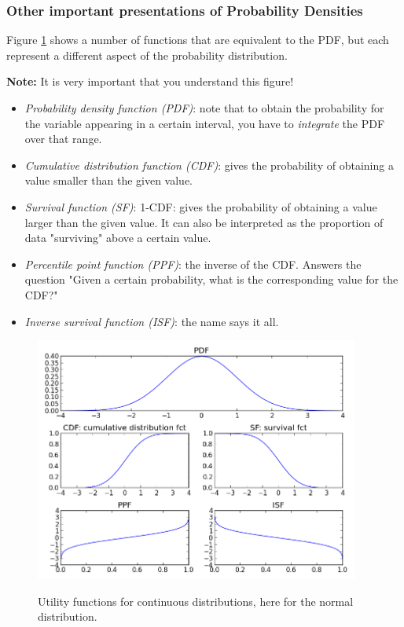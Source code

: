 \subsubsection{Other important presentations of Probability Densities}

Figure \ref{fig:DistributionUtilities} shows a number of functions that are equivalent to the PDF, but each represent a different aspect of the probability distribution.

\textbf{Note: }It is very important that you understand this figure!

\begin{itemize}
  \item \emph{Probability density function (PDF)}: note that to obtain the probability for the variable appearing in a certain interval, you have to \emph{integrate} the PDF over that range.
  \item \emph{Cumulative distribution function (CDF)}: gives the probability of obtaining a value smaller than the given value.
  \item \emph{Survival function (SF)}: 1-CDF: gives the probability of obtaining a value larger than the given value. It can also be interpreted as the proportion of data "surviving" above a certain value.
  \item \emph{Percentile point function (PPF)}: the inverse of the CDF. Answers the question "Given a certain probability, what is the corresponding value for the CDF?"
  \item \emph{Inverse survival function (ISF)}: the name says it all.
\end{itemize}

\begin{figure}[h]
  \centering
  \includegraphics[width=0.95\textwidth]{../Images/DistributionFunctions.png}\\
  \caption{Utility functions for continuous distributions, here for the normal distribution.}\label{fig:DistributionUtilities}
\end{figure}

